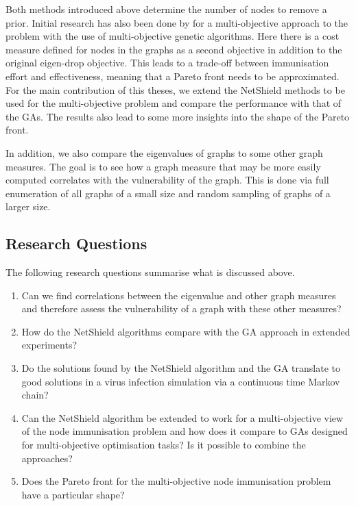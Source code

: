 \documentclass[11pt]{article}
\theoremstyle{definition}
\begin{document}
Both methods introduced above determine the number of nodes to remove a prior. Initial research has also been done by \cite{maulana2017immunization} for a multi-objective approach to the problem with the use of multi-objective genetic algorithms. Here there is a cost measure defined for nodes in the graphs as a second objective in addition to the original eigen-drop objective. This leads to a trade-off between immunisation effort and effectiveness, meaning that a Pareto front needs to be approximated. For the main contribution of this theses, we extend the NetShield methods to be used for the multi-objective problem and compare the performance with that of the GAs. The results also lead to some more insights into the shape of the Pareto front.

In addition, we also compare the eigenvalues of graphs to some other graph measures. The goal is to see how a graph measure that may be more easily computed correlates with the vulnerability of the graph. This is done via full enumeration of all graphs of a small size and random sampling of graphs of a larger size.

\subsection{Research Questions}

The following research questions summarise what is discussed above.

\begin{enumerate}
    \item Can we find correlations between the eigenvalue and other graph measures and therefore assess the vulnerability of a graph with these other measures?
    \item How do the NetShield algorithms compare with the GA approach in  extended experiments?
    \item Do the solutions found by the NetShield algorithm and the GA translate to good solutions in a virus infection simulation via a continuous time Markov chain?
    \item Can the NetShield algorithm be extended to work for a multi-objective view of the node immunisation problem and how does it compare to GAs designed for multi-objective optimisation tasks? Is it possible to combine the approaches?
    \item Does the Pareto front for the multi-objective node immunisation problem have a particular shape?
\end{enumerate}
\end{document}
